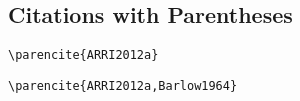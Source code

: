 \textcite{ARRI2012a,Barlow1964}

\subsection*{Citations with Parentheses}%
\label{subsec:citations-with-parentheses}

\begin{lstlisting}[caption={Citation with Parentheses for Single Author.}]
\parencite{ARRI2012a}
\end{lstlisting}

\parencite{ARRI2012a}

\begin{lstlisting}[caption={Citation with Parentheses for Multiple Authors.}s]
\parencite{ARRI2012a,Barlow1964}
\end{lstlisting}

\parencite{ARRI2012a,Barlow1964}

